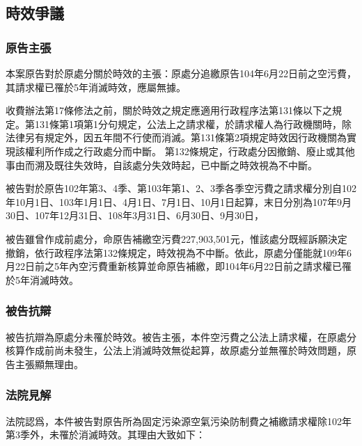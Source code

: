 \documentclass[11pt,a4paper]{article}
\begin{document}
\subsection{時效爭議}
\subsubsection{原告主張}
本案原告對於原處分關於時效的主張：原處分追繳原告104年6月22日前之空污費，其請求權已罹於5年消滅時效，應屬無據。


收費辦法第17條修法之前，關於時效之規定應適用行政程序法第131條以下之規定。第131條第1項第1分句規定，公法上之請求權，於請求權人為行政機關時，除法律另有規定外，因五年間不行使而消滅。第131條第2項規定時效因行政機關為實現該權利所作成之行政處分而中斷。 第132條規定，行政處分因撤銷、廢止或其他事由而溯及既往失效時，自該處分失效時起，已中斷之時效視為不中斷。

被告對於原告102年第3、4季、第103年第1、2、3季各季空污費之請求權分別自102年10月1日、103年1月1日、4月1日、7月1日、10月1日起算，末日分別為107年9月30日、107年12月31日、108年3月31日、6月30日、9月30日，

被告雖曾作成前處分，命原告補繳空污費227,903,501元，惟該處分既經訴願決定撤銷，依行政程序法第132條規定，時效視為不中斷。依此，原處分僅能就109年6月22日前之5年內空污費重新核算並命原告補繳，即104年6月22日前之請求權已罹於5年消滅時效。

\subsubsection{被告抗辯}

被告抗辯為原處分未罹於時效。被告主張，本件空污費之公法上請求權，在原處分核算作成前尚未發生，公法上消滅時效無從起算，故原處分並無罹於時效問題，原告主張顯無理由。


\subsubsection{法院見解}
法院認爲，本件被告對原告所為固定污染源空氣污染防制費之補繳請求權除102年第3季外，未罹於消滅時效。其理由大致如下：
\end{document}
